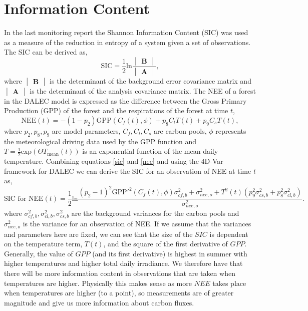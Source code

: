 \documentclass[11pt]{article}
\begin{document}
\section{Information Content}

In the last monitoring report the Shannon Information Content (SIC) was used as a measure of the reduction in entropy of a system given a set of observations. The SIC can be derived as,
\begin{equation} \label{sic}
\text{SIC}=\frac{1}{2}\text{ln}\frac{\begin{vmatrix} \textbf{B} \end{vmatrix}}{\begin{vmatrix} \textbf{A} \end{vmatrix}},
\end{equation}
where $\begin{vmatrix} \textbf{B} \end{vmatrix}$ is the determinant of the background error covariance matrix and $\begin{vmatrix} \textbf{A} \end{vmatrix}$ is the determinant of the analysis covariance matrix. The NEE of a forest in the DALEC model is expressed as the difference between the Gross Primary Production (GPP) of the forest and the respirations of the forest at time $t$,
\begin{equation} \label{nee}
\text{NEE}(t)=-(1-p_2)\text{GPP}(C_f(t),\phi)+p_8C_lT(t)+p_9C_sT(t),
\end{equation}
where $p_2, p_8, p_9$ are model parameters, $C_f, C_l, C_s$ are carbon pools, $\phi$ represents the meteorological driving data used by the GPP function and $T=\frac{1}{2}\text{exp}(\Theta T_{\text{mean}}(t))$ is an exponential function of the mean daily temperature. Combining equations \ref{sic} and \ref{nee} and using the 4D-Var framework for DALEC we can derive the SIC for an observation of NEE at time $t$ as,
\begin{equation}
\text{SIC for NEE}(t)=\frac{1}{2}\text{ln}\frac{(p_{2}-1)^{2}\text{GPP}'^{2}(C_f(t), \phi)\sigma_{cf,b}^{2}+\sigma_{nee,o}^{2}+T^2(t)(p_{9}^2\sigma_{cs,b}^2+p_8^2\sigma_{cl,b}^2)}{\sigma_{nee,o}^{2}}.
\end{equation}
where $\sigma_{cf,b}^{2}, \sigma_{cl,b}^2, \sigma_{cs,b}^2$ are the background variances for the carbon pools and $\sigma_{nee,o}^{2}$ is the variance for an observation of NEE. If we assume that the variances and parameters here are fixed, we can see that the size of the $SIC$ is dependent on the temperature term, $T(t)$, and the square of the first derivative of $GPP$. Generally, the value of $GPP$ (and its first derivative) is highest in summer with higher temperatures and higher total daily irradiance. We therefore have that there will be more information content in observations that are taken when temperatures are higher. Physically this makes sense as more $NEE$ takes place when temperatures are higher (to a point), so measurements are of greater magnitude and give us more information about carbon fluxes. 
\end{document}
